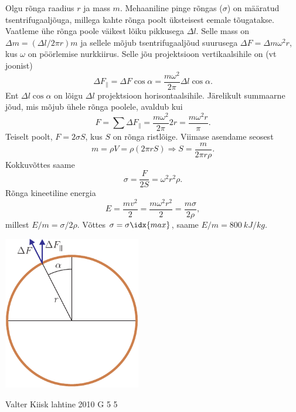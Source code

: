 \documentclass[11pt]{article}
\begin{document}
{{\osa Olgu rõnga raadius $r$ ja mass $m$. Mehaaniline pinge rõngas ($\sigma$) on määratud tsentrifugaaljõuga, millega kahte rõnga poolt üksteisest eemale tõugatakse. Vaatleme ühe rõnga poole väikest lõiku pikkusega $\Delta l$. Selle mass on $\Delta m = (\Delta l/2\pi r)m$ ja sellele mõjub tsentrifugaaljõud suurusega $\Delta F = \Delta m\omega^2 r$, kus $\omega$ on pöörlemise nurkkiirus. Selle jõu projektsioon vertikaalsihile on (vt joonist)
\[
\Delta F_{ \|}=\Delta F \cos \alpha=\frac{m \omega^{2}}{2 \pi} \Delta l \cos \alpha.
\]
Ent $\Delta l \cos \alpha$ on lõigu $\Delta l$ projektsioon horisontaalsihile. Järelikult summaarne jõud, mis mõjub ühele rõnga poolele, avaldub kui
\[
F=\sum \Delta F_{ \|}=\frac{m \omega^{2}}{2 \pi} 2 r=\frac{m \omega^{2} r}{\pi}.
\]
Teiselt poolt, $F = 2\sigma S$, kus $S$ on rõnga ristlõige. Viimase asendame seosest
\[
m=\rho V=\rho(2 \pi r S) \Rightarrow S=\frac{m}{2 \pi r \rho}.
\]
Kokkuvõttes saame
\[
\sigma = \frac{F}{2S} = \omega^2 r^2 \rho.
\]
Rõnga kineetiline energia
\[
E = \frac{mv^2}{2} = \frac{m\omega^2r^2}{2} = \frac{m\sigma}{2\rho},
\]
millest $E/m = \sigma /2\rho$. Võttes $\sigma = \sigma\idx{max}$, saame $E/m = \SI{800}{kJ/kg}$.

\begin{center}
	\includegraphics[width=0.45\textwidth]{2007-v3g-04-yl}
\end{center}
\fi
}

{Valter Kiisk} %
{lahtine} %
{2010} %
{G 5} %
{5} %
{

}}
\end{document}
